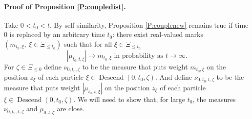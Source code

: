 \documentclass[12pt]{article}
\DeclareMathOperator{\descend}{Descend}
\begin{document}
\paragraph{Proof of Proposition \ref{P:coupledist}.}
Take $0 < t_0 < t$.
By self-similarity, Proposition \ref{P:couplenew} remains true if time $0$ is replaced by an arbitrary time $t_0$: 
there exist real-valued marks 
$(m_{t_0, \xi}, \ \xi \in \Xi_{\le t_0})$ such that for all $\xi \in \Xi_{\le t_0}$
\begin{equation}
 | \mu_{t_0,t,\xi}| \to m_{t_0, \xi} \mbox{ in probability as } t \to \infty. 
 \label{eq:mutt}
 \end{equation}
For $\zeta \in \Xi_{\le 0}$ define $\nu_{0,t_0,\zeta}$ to be the measure that puts weight $ m_{t_0, \xi} $ 
on the position $z_\xi$ of each particle $\xi \in \descend(0,t_0,\zeta)$.
And define $\nu_{0,t_0,t,\zeta}$ to be the measure that puts weight $|  \mu_{t_0, t,\xi} |$ 
on the position $z_\xi$ of each particle $\xi \in \descend(0,t_0,\zeta)$.  
We will need to show that, for large $t_0$, the measures
 $\nu_{0,t_0,t,\zeta}$ and $\mu_{0,t,\zeta} $ are close.
 
\end{document}
